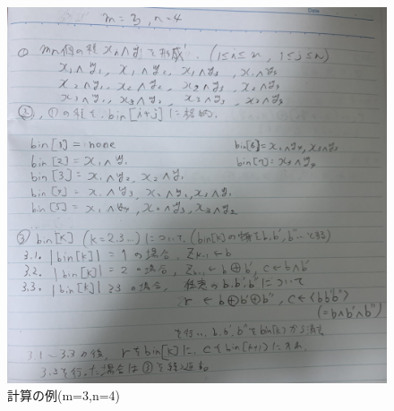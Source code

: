 \documentclass[dvipdfmx,a4paper,12pt]{jsarticle}
\begin{document}
\begin{figure}[htbp]
  \centering
  \includegraphics[width=130mm]{images/IMG_7410.jpg}
  \caption{計算の例(m=3,n=4)}
\end{figure}
\end{document}
